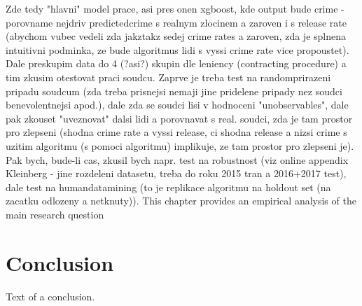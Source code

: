 \documentclass[12pt, twoside,openany]{book} %
\begin{document}
Zde tedy "hlavni" model prace, asi pres onen xgboost, kde output bude crime - porovname nejdriv predictedcrime s realnym zlocinem a zaroven i s release rate (abychom vubec vedeli zda jakztakz sedej crime rates a zaroven, zda je splnena intuitivni podminka, ze bude algoritmus lidi s vyssi crime rate vice propoustet). Dale preskupim data do 4 (?asi?) skupin dle leniency (contracting procedure) a tim zkusim otestovat praci soudcu. Zaprve je treba test na randomprirazeni pripadu soudcum (zda treba prisnejsi nemaji jine pridelene pripady nez soudci benevolentnejsi apod.), dale zda se soudci lisi v hodnoceni "unobservables", dale pak zkouset "uveznovat" dalsi lidi a porovnavat s real. soudci, zda je tam prostor pro zlepseni (shodna crime rate a vyssi release, ci shodna release a nizsi crime s uzitim algoritmu (s pomoci algoritmu) implikuje, ze tam prostor pro zlepseni je).\newline
Pak bych, bude-li cas, zkusil bych napr. test na robustnost (viz online appendix Kleinberg - jine rozdeleni datasetu, treba do roku 2015 tran a 2016+2017 test), dale test na humandatamining (to je replikace algoritmu na holdout set (na zacatku odlozeny a netknuty)).\newline
This chapter provides an empirical analysis of the main research question




\chapter*{Conclusion}          %

Text of a conclusion.




\end{document}
